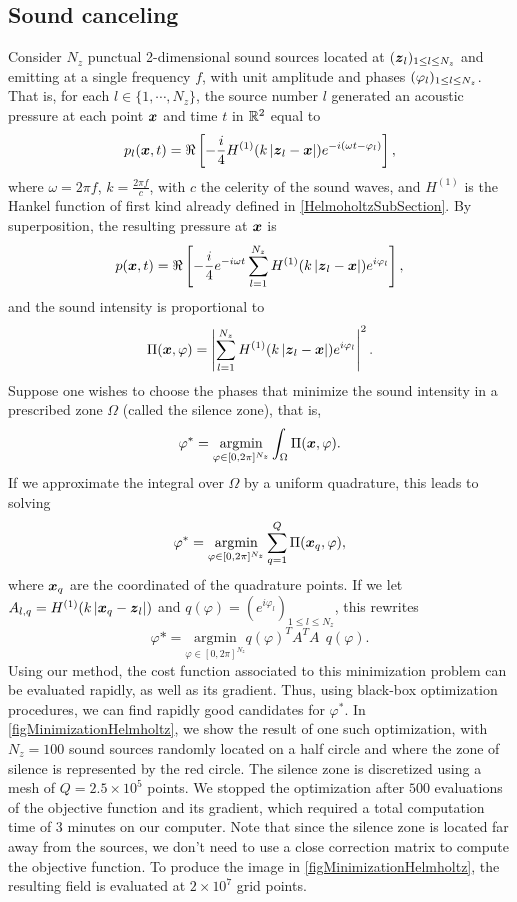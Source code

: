 \documentclass[smallextended]{svjour3}
\begin{document}
\subsection{Sound canceling}
																																																		
Consider $N_z$ punctual 2-dimensional sound sources located at $(\boldsymbol{z}_{l})_{1 \leq l \leq N_z}$  and emitting at a single frequency $f$, with unit amplitude and phases $(\varphi_{l})_{1 \leq l \leq N_z}$. That is, for each $l \in \{1,\cdots, N_z\}$, the source number $l$ generated an acoustic pressure at each point $\boldsymbol{x}$ and time $t$ in $\mathbb{R}^2$ equal to 
\[p_l(\boldsymbol{x},t) = \Re\left[-\frac{i}{4}H^{(1)}(k\left\lvert \boldsymbol{z}_l - \boldsymbol{x} \right\rvert) e^{-i\left(\omega t - \varphi_l \right)}\right],\]
where $\omega = 2\pi f$, $k = \frac{2\pi f}{c}$, with $c$ the celerity of the sound waves, and $H^{(1)}$ is the Hankel function of first kind already defined in \autoref{HelmoholtzSubSection}. 
By superposition, the resulting pressure at $\boldsymbol{x}$ is 
\[p(\boldsymbol{x},t) = \Re\left[ -\frac{i}{4}e^{-i \omega t} \sum_{l=1}^{N_z} H^{(1)}(k\left\lvert \boldsymbol{z}_l - \boldsymbol{x} \right\rvert)e^{i \varphi_l} \right],\]
and the sound intensity is proportional to
\[\Pi(\boldsymbol{x},\varphi) =  \left\lvert  \sum_{l=1}^{N_z} H^{(1)}(k\left\lvert \boldsymbol{z}_l - \boldsymbol{x} \right\rvert)e^{i \varphi_l}  \right\rvert^2.\]
Suppose one wishes to choose the phases that minimize the sound intensity in a prescribed zone $\Omega$ (called the silence zone), that is,
\[ \varphi^* = \underset{\varphi \in [0,2\pi]^{N_z}}{\text{argmin}}\int_{\Omega}\Pi(\boldsymbol{x},\varphi). \]
If we approximate the integral over $\Omega$ by a uniform quadrature, this leads to solving 
\[\varphi^* = \underset{\varphi \in [0,2\pi]^{N_z}}{\text{argmin}} \sum_{q=1}^{Q}\Pi(\boldsymbol{x}_q,\varphi), \]
where $\boldsymbol{x}_q$ are the coordinated of the quadrature points. If we let $A_{l,q} = H^{(1)}(k\left\lvert \boldsymbol{x}_q - \boldsymbol{z}_l \right\rvert)$ and $q(\varphi) = \left(e^{i\varphi_l}\right)_{1 \leq l \leq N_z}$, this rewrites
\[ \varphi* = \underset{\varphi \in [0,2\pi]^{N_z}}{\text{argmin}} q(\varphi)^T A^T A ~ ~ q(\varphi).\]
Using our method, the cost function associated to this minimization problem can be evaluated rapidly, as well as its gradient. Thus, using black-box optimization procedures, we can find rapidly good candidates for $\varphi^*$. In \autoref{figMinimizationHelmholtz}, we show the result of one such optimization, with $N_z=100$ sound sources randomly located on a half circle and where the zone of silence is represented by the red circle. The silence zone is discretized using a mesh of $Q = 2.5\times 10^5$ points. We stopped the optimization after $500$ evaluations of the objective function and its gradient, which required a total computation time of 3 minutes on our computer. Note that since the silence zone is located far away from the sources, we don't need to use a close correction matrix to compute the objective function. To produce the image in \autoref{figMinimizationHelmholtz}, the resulting field is evaluated at $2 \times 10^7$ grid points.
																																																		
\end{document}
